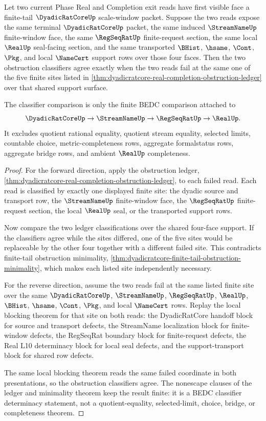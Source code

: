 \begin{theorem}
\label{thm:dyadicratcore-finite-tail-obstruction-classifier-determinacy}
Let two current Phase Real and Completion exit reads have first visible face a finite-tail $\DyadicRatCoreUp$ scale-window packet. Suppose the two reads expose the same terminal $\DyadicRatCoreUp$ packet, the same induced $\StreamNameUp$ finite-window face, the same $\RegSeqRatUp$ finite-request section, the same local $\RealUp$ seal-facing section, and the same transported $\BHist$, $\hsame$, $\Cont$, $\Pkg$, and local $\NameCert$ support rows over those four faces. Then the two obstruction classifiers agree exactly when the two reads fail at the same one of the five finite sites listed in \autoref{thm:dyadicratcore-real-completion-obstruction-ledger} over that shared support surface.

The classifier comparison is only the finite BEDC comparison attached to
$$
\DyadicRatCoreUp \to \StreamNameUp \to \RegSeqRatUp \to \RealUp.
$$
It excludes quotient rational equality, quotient stream equality, selected limits, countable choice, metric-completeness rows, aggregate formalstatus rows, aggregate bridge rows, and ambient $\RealUp$ completeness.
\end{theorem}
\begin{proof}
For the forward direction, apply the obstruction ledger, \autoref{thm:dyadicratcore-real-completion-obstruction-ledger}, to each failed read. Each read is classified by exactly one displayed finite site: the dyadic source and transport row, the $\StreamNameUp$ finite-window face, the $\RegSeqRatUp$ finite-request section, the local $\RealUp$ seal, or the transported support rows.

Now compare the two ledger classifications over the shared four-face support. If the classifiers agree while the sites differed, one of the five sites would be replaceable by the other four together with a different failed site. This contradicts finite-tail obstruction minimality, \autoref{thm:dyadicratcore-finite-tail-obstruction-minimality}, which makes each listed site independently necessary.

For the reverse direction, assume the two reads fail at the same listed finite site over the same $\DyadicRatCoreUp$, $\StreamNameUp$, $\RegSeqRatUp$, $\RealUp$, $\BHist$, $\hsame$, $\Cont$, $\Pkg$, and local $\NameCert$ rows. Replay the local blocking theorem for that site on both reads: the DyadicRatCore handoff block for source and transport defects, the StreamName localization block for finite-window defects, the RegSeqRat boundary block for finite-request defects, the Real L10 determinacy block for local seal defects, and the support-transport block for shared row defects.

The same local blocking theorem reads the same failed coordinate in both presentations, so the obstruction classifiers agree. The nonescape clauses of the ledger and minimality theorem keep the result finite: it is a BEDC classifier determinacy statement, not a quotient-equality, selected-limit, choice, bridge, or completeness theorem.
\end{proof}

